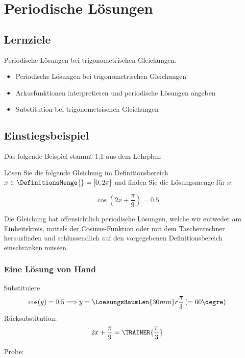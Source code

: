 
\section{Periodische Lösungen}

\subsection*{Lernziele}

Periodische Lösungen bei trigonometrischen Gleichungen.

\begin{itemize}
\item Periodische Lösungen bei trigonometrischen Gleichungen
\item Arkusfunktionen interpretieren und periodische Lösungen angeben
\item Substitution bei trigonometrischen Gleichungen
\end{itemize}
\newpage


\subsection{Einstiegsbeispiel}
Das folgende Beispiel stammt 1:1 aus dem Lehrplan:

Lösen Sie die folgende Gleichung im Definitionsbereich $x \in \DefinitionsMenge{} = [ 0, 2\pi]$ und finden Sie die Lösungsmenge für $x$:

$$\cos\left(2x+\frac{\pi}{9}\right) = 0.5$$

Die Gleichung hat offensichtlich periodische Lösungen, welche wir
entweder am Einheitskreis, mittels der Cosinus-Funktion oder mit dem
Taschenrechner herausfinden und schlussendlich auf den vorgegebenen
Definitionsbereich einschränken müssen.

\subsubsection{Eine Lösung von Hand}

Substituiere 
$$\cos(y) = 0.5 \Longrightarrow y=\LoesungsRaumLen{30mm}r{\frac{\pi}3} \left(=60\degre\right)$$
Rücksubstitution:
$$ 2x+\frac{\pi}9 = \TRAINER{\frac{\pi}3}$$

Probe:

